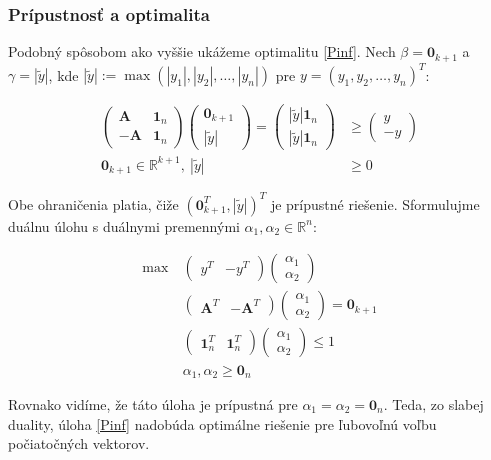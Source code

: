 \documentclass[report.tex]{subfiles}
\begin{document}
\newpage

\subsubsection{Prípustnosť a optimalita}\label{sec:InfOptim}

Podobný spôsobom ako vyššie ukážeme optimalitu \eqref{Pinf}. Nech $\beta = \mathbf{0}_{k+1}$ a $\gamma = |\tilde{y}|$, kde $|\tilde{y}| := \max(|y_1|, |y_2|, \dots, |y_n|)$ pre $y = (y_1, y_2, \dots, y_n)^T$:

\begin{align*}
	\left(
	\begin{array}{c|c}
		\mathbf{A} & \mathbf{1}_n \\
		\hline
		-\mathbf{A} & \mathbf{1}_n
	\end{array}
	\right)
	\left(
	\begin{array}{c}
		\mathbf{0}_{k+1} \\
		\hline
		|\tilde{y}|
	\end{array}
	\right)
	=
	\left(
		\begin{array}{c}
			|\tilde{y}| \mathbf{1}_n \\
			\hline
			|\tilde{y}| \mathbf{1}_n
		\end{array}
	\right)
	&\geq
	\left(
		\begin{array}{c}
			y \\
			\hline
			-y
		\end{array}
	\right) \\
	\mathbf{0}_{k+1} \in \mathbb{R}^{k+1},~|\tilde{y}| &\geq 0 
\end{align*}

Obe ohraničenia platia, čiže $(\mathbf{0}_{k+1}^T, |\tilde{y}|)^T$ je prípustné riešenie. Sformulujme duálnu úlohu s duálnymi premennými $\alpha_1, \alpha_2 \in \mathbb{R}^n$:

\begin{align*}
	\text{max}~ &
	\left(
		\begin{array}{c|c}
			y^T & -y^T
		\end{array}
	\right)
	\left(
		\begin{array}{c}
			\alpha_1 \\
			\hline
			\alpha_2
		\end{array}
	\right) \\
	&\left(
		\begin{array}{c|c}
			\mathbf{A}^T & -\mathbf{A}^T
		\end{array}
	\right)
	\left(
		\begin{array}{c}
			\alpha_1 \\
			\hline
			\alpha_2
		\end{array}
	\right)
	=
	\mathbf{0}_{k+1} \\
	&\left(
		\begin{array}{c|c}
			\mathbf{1}_n^T & \mathbf{1}_n^T
		\end{array}
	\right)
	\left(
		\begin{array}{c}
			\alpha_1 \\
			\hline
			\alpha_2
		\end{array}
	\right)
	\leq
	1 \\
	&\alpha_1, \alpha_2 \geq \mathbf{0}_{n} 
\end{align*}

Rovnako vidíme, že táto úloha je prípustná pre $\alpha_1 = \alpha_2 = \mathbf{0}_n$. Teda, zo slabej duality, úloha \eqref{Pinf} nadobúda optimálne riešenie pre ľubovoľnú voľbu počiatočných vektorov.
\end{document}
